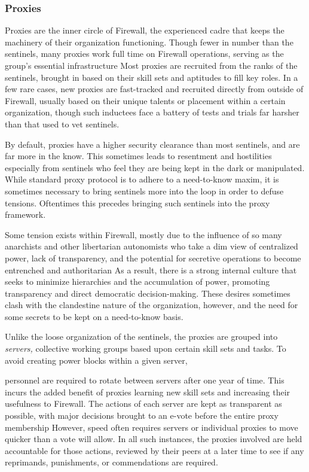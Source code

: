 \subsubsection{Proxies } 

Proxies are the inner circle of Firewall, the experienced cadre that keeps the machinery of their organization functioning. Though fewer in number than the sentinels, many proxies work full time on Firewall operations, serving as the group's essential infrastructure Most proxies are recruited from the ranks of the sentinels, brought in based on their skill sets and aptitudes to fill key roles. In a few rare cases, new proxies are fast-tracked and recruited directly from outside of Firewall, usually based on their unique talents or placement within a certain organization, though such inductees face a battery of tests and trials far harsher than that used to vet sentinels. 

By default, proxies have a higher security clearance than most sentinels, and are far more in the know. This sometimes leads to resentment and hostilities especially from sentinels who feel they are being kept in the dark or manipulated. While standard proxy protocol is to adhere to a need-to-know maxim, it is sometimes necessary to bring sentinels more into the loop in order to defuse tensions. Oftentimes this precedes bringing such sentinels into the proxy framework. 

Some tension exists within Firewall, mostly due to the influence of so many anarchists and other libertarian autonomists who take a dim view of centralized power, lack of transparency, and the potential for secretive operations to become entrenched and authoritarian As a result, there is a strong internal culture that seeks to minimize hierarchies and the accumulation of power, promoting transparency and direct democratic decision-making. These desires sometimes clash with the clandestine nature of the organization, however, and the need for some secrets to be kept on a need-to-know basis. 

Unlike the loose organization of the sentinels, the proxies are grouped into \textit{servers,} collective working groups based upon certain skill sets and tasks. To avoid creating power blocks within a given server, 

personnel are required to rotate between servers after one year of time. This incurs the added benefit of proxies learning new skill sets and increasing their usefulness to Firewall. The actions of each server are kept as transparent as possible, with major decisions brought to an e-vote before the entire proxy membership However, speed often requires servers or individual proxies to move quicker than a vote will allow. In all such instances, the proxies involved are held accountable for those actions, reviewed by their peers at a later time to see if any reprimands, punishments, or commendations are required. 


